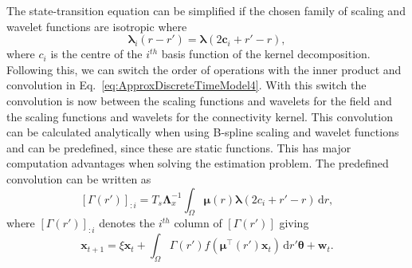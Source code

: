 \documentclass[review,authoryear,3p]{elsarticle}
\newcommand{\parham}[1]{\textcolor{red}{#1}}
\begin{document}
The state-transition equation can be simplified if the chosen family of scaling and wavelet functions are isotropic where
\begin{equation}
	\boldsymbol{\lambda}_{i}(r-r') = \boldsymbol{\lambda}(2\mathbf{c}_{i}+r'-r), 
\end{equation}
where $c_i$ is the centre of the $i^{th}$ basis function of the kernel decomposition. Following this, we can switch the order of operations with the inner product and convolution in Eq.~\eqref{eq:ApproxDiscreteTimeModel4}. With this switch the convolution is now between the scaling functions and wavelets for the field and the scaling functions and wavelets for the connectivity kernel. This convolution can be calculated analytically when using B-spline scaling and wavelet functions and can be predefined, since these are static functions. This has major computation advantages when solving the estimation problem. %
The predefined convolution can be written as
\begin{equation}\label{eq:Gammaij}
	\left[\Gamma(r')\right]_{:i} = T_s \mathbf{\Lambda}_{x}^{-1}\int_{\Omega} \boldsymbol\mu\left(r\right)\boldsymbol\lambda\left(2c_{i} + r'-r\right) \,\mathrm{d}r,
\end{equation} 
 where $\left[\Gamma(r')\right]_{:i}$ denotes the $i^{th}$ column of  $\left[\Gamma(r')\right]$ giving
\begin{equation}
	\mathbf{x}_{t+1} = 
	\xi \mathbf{x}_t + 
	\int_{\Omega} \Gamma\left(r'\right)f\left(\boldsymbol\mu^\top\left(r'\right) \mathbf{x}_t\right) 
	\, \mathrm{d}r' \boldsymbol\theta
	+ \mathbf w_t.
\end{equation}
\end{document}
